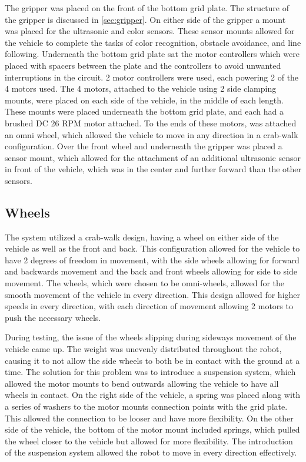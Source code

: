 \documentclass[11pt]{report}
\begin{document}
\par The gripper was placed on the front of the bottom grid plate. The structure of the gripper is discussed in \cref{sec:gripper}. On either side of the gripper a mount was placed for the ultrasonic and color sensors. These sensor mounts allowed for the vehicle to complete the tasks of color recognition, obstacle avoidance, and line following. Underneath the bottom grid plate sat the motor controllers which were placed with spacers between the plate and the controllers to avoid unwanted interruptions in the circuit. 2 motor controllers were used, each powering 2 of the 4 motors used. The 4 motors, attached to the vehicle using 2 side clamping mounts, were placed on each side of the vehicle, in the middle of each length. These mounts were placed underneath the bottom grid plate, and each had a brushed \gls{DC} 26 \gls{RPM} motor attached. To the ends of these motors, was attached an omni wheel, which allowed the vehicle to move in any direction in a crab-walk configuration. Over the front wheel and underneath the gripper was placed a sensor mount, which allowed for the attachment of an additional ultrasonic sensor in front of the vehicle, which was in the center and further forward than the other sensors. 

\subsection{Wheels}
The system utilized a crab-walk design, having a wheel on either side of the vehicle as well as the front and back. This configuration allowed for the vehicle to have 2 degrees of freedom in movement, with the side wheels allowing for forward and backwards movement and the back and front wheels allowing for side to side movement. The wheels, which were chosen to be omni-wheels, allowed for the smooth movement of the vehicle in every direction. This design allowed for higher speeds in every direction, with each direction of movement allowing 2 motors to push the necessary wheels. 
\par During testing, the issue of the wheels slipping during sideways movement of the vehicle came up. The weight was unevenly distributed throughout the robot, causing it to not allow the side wheels to both be in contact with the ground at a time. The solution for this problem was to introduce a suspension system, which allowed the motor mounts to bend outwards allowing the vehicle to have all wheels in contact. On the right side of the vehicle, a spring was placed along with a series of washers to the motor mounts connection points with the grid plate. This allowed the connection to be looser and have more flexibility. On the other side of the vehicle, the bottom of the motor mount included springs, which pulled the wheel closer to the vehicle but allowed for more flexibility. The introduction of the suspension system allowed the robot to move in every direction effectively. 
\end{document}
